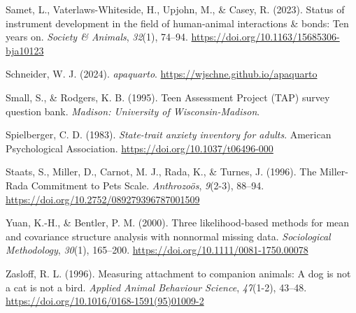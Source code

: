 \documentclass[
  jou,
  longtable,
  nolmodern,
  notxfonts,
  notimes,
  colorlinks=true,linkcolor=blue,citecolor=blue,urlcolor=blue]{apa7}
\newlength{\cslhangindent}
\newenvironment{CSLReferences}[2] %
 {\begin{list}{}{%
  \setlength{\itemindent}{0pt}
  \setlength{\leftmargin}{0pt}
  \setlength{\parsep}{0pt}
  \ifodd #1
   \setlength{\leftmargin}{\cslhangindent}
   \setlength{\itemindent}{-1\cslhangindent}
  \fi
  \setlength{\itemsep}{#2\baselineskip}}}
 {\end{list}}
\begin{document}
\begin{CSLReferences}{1}{0}
Samet, L., Vaterlaws-Whiteside, H., Upjohn, M., \& Casey, R. (2023).
Status of instrument development in the field of human-animal
interactions \& bonds: {Ten} years on. \emph{Society \& Animals},
\emph{32}(1), 74--94. \url{https://doi.org/10.1163/15685306-bja10123}

Schneider, W. J. (2024). \emph{{apaquarto}}.
\url{https://wjschne.github.io/apaquarto}

Small, S., \& Rodgers, K. B. (1995). Teen {Assessment Project} ({TAP})
survey question bank. \emph{Madison: University of Wisconsin-Madison}.

Spielberger, C. D. (1983). \emph{State-trait anxiety inventory for
adults}. American Psychological Association.
\url{https://doi.org/10.1037/t06496-000}

Staats, S., Miller, D., Carnot, M. J., Rada, K., \& Turnes, J. (1996).
The {Miller-Rada Commitment} to {Pets Scale}. \emph{Anthrozo{ö}s},
\emph{9}(2-3), 88--94. \url{https://doi.org/10.2752/089279396787001509}

Yuan, K.-H., \& Bentler, P. M. (2000). Three likelihood-based methods
for mean and covariance structure analysis with nonnormal missing data.
\emph{Sociological Methodology}, \emph{30}(1), 165--200.
\url{https://doi.org/10.1111/0081-1750.00078}

Zasloff, R. L. (1996). Measuring attachment to companion animals: A dog
is not a cat is not a bird. \emph{Applied Animal Behaviour Science},
\emph{47}(1-2), 43--48.
\url{https://doi.org/10.1016/0168-1591(95)01009-2}

\end{CSLReferences}
\end{document}
